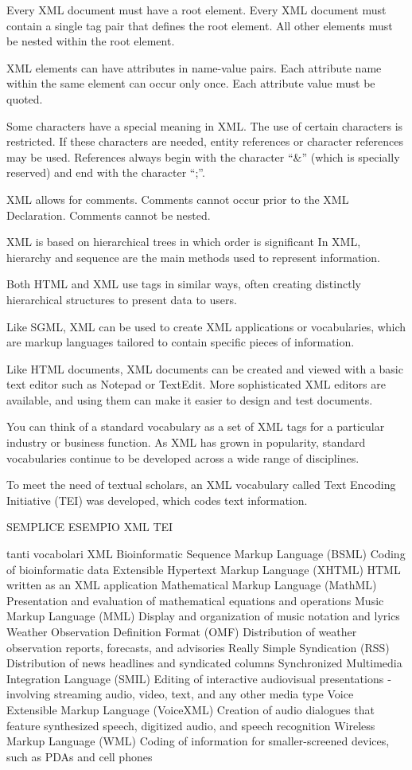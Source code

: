 Every XML document must have a root element. Every XML document must contain a single tag pair that defines
the root element. All other elements must be nested within the
root element.

XML elements can have attributes in name-value pairs. Each attribute name within the same element can occur only once.
Each attribute value must be quoted.

Some characters have a ­special meaning in XML. The use of certain characters is restricted. If these characters are
needed, entity references or character references may be used.
References always begin with the character “&” (which is ­specially
reserved) and end with the character “;”.

XML allows for comments. Comments cannot occur prior to the XML Declaration. Comments
cannot be nested.

XML is based on hierarchical trees in
which order is significant 
In XML, hierarchy and sequence are the main methods
used to represent information.

Both HTML and XML use tags in
similar ways, often creating distinctly hierarchical structures to present data to users.


Like SGML,
XML can be used to create XML applications or vocabularies, which are markup
languages tailored to contain specific pieces of information.

Like HTML documents, XML documents can be created and viewed with a basic text
editor such as Notepad or TextEdit. More sophisticated XML editors are available, and
using them can make it easier to design and test documents.


You can think of a standard vocabulary as a set of XML tags for a particular
industry or business function. As XML has grown in popularity, standard vocabularies
continue to be developed across a wide range of disciplines.


To meet the need of textual scholars, an XML ­vocabulary
called Text Encoding Initiative (TEI) was developed, which codes text
i­nformation.

SEMPLICE ESEMPIO XML TEI


tanti vocabolari XML
Bioinformatic Sequence Markup
Language (BSML) Coding of bioinformatic data
Extensible Hypertext Markup Language
(XHTML) HTML written as an XML application
Mathematical Markup Language
(MathML) Presentation and evaluation of mathematical equations
and operations
Music Markup Language (MML) Display and organization of music notation and lyrics
Weather Observation Definition
Format (OMF) Distribution of weather observation reports, forecasts, and
advisories
Really Simple Syndication (RSS) Distribution of news headlines and syndicated columns
Synchronized Multimedia Integration
Language (SMIL) Editing of interactive audiovisual presentations ­involving
streaming audio, video, text, and any other media type
Voice Extensible Markup Language
(VoiceXML) Creation of audio dialogues that feature synthesized
speech, digitized audio, and speech recognition
Wireless Markup Language (WML) Coding of information for smaller-screened devices, such
as PDAs and cell phones


